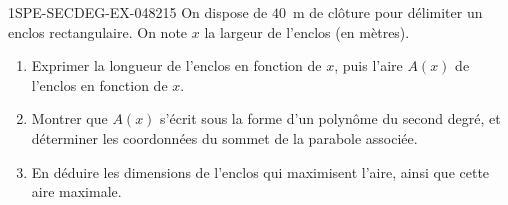 \begin{exercice}{1SPE-SECDEG-EX-048}{2}{15}
On dispose de $40$~m de clôture pour délimiter un enclos rectangulaire. On note $x$ la largeur de l'enclos (en mètres).

\begin{enumerate}
  \item Exprimer la longueur de l'enclos en fonction de $x$, puis l'aire $A(x)$ de l'enclos en fonction de $x$.
  \item Montrer que $A(x)$ s'écrit sous la forme d'un polynôme du second degré, et déterminer les coordonnées du sommet de la parabole associée.
  \item En déduire les dimensions de l'enclos qui maximisent l'aire, ainsi que cette aire maximale.
\end{enumerate}
\end{exercice}
